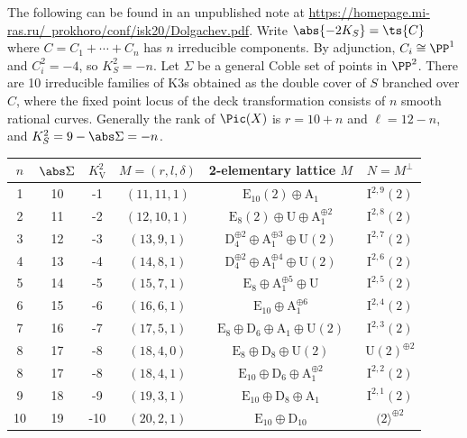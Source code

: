 \documentclass[../../main.tex]{subfiles}
\begin{document}
The following can be found in an unpublished note at \href{https://homepage.mi-ras.ru/~prokhoro/conf/isk20/Dolgachev.pdf}{https://homepage.mi-ras.ru/~prokhoro/conf/isk20/Dolgachev.pdf}.
Write $\abs{-2K_S} = \ts{C}$ where $C = C_1 + \cdots + C_n$ has $n$ irreducible components. By adjunction, $C_i\cong \PP^1$ and $C_i^2 = -4$, so $K_S^2 = -n$. Let $\Sigma$ be a general Coble set of points in $\PP^2$. There are 10 irreducible families of K3s obtained as the double cover of $S$ branched over $C$, where the fixed point locus of the deck transformation consists of $n$ smooth rational curves. Generally the rank of $\Pic(X)$ is $r=10+n$ and $\ell = 12-n$, and $K_S^2 = 9-\abs\Sigma = -n$.

\begin{tabular}{|c|c|c|c|c|c|}
\hline$n$ & $\abs\Sigma$ & $K_{\mathrm{V}}^{2}$ & $M = (r, l, \delta)$ & 2-elementary lattice $M$ & $N=M^{\perp}$ \\
\hline 1 & 10 & -1 & $(11,11,1)$ & $\mathrm{E}_{10}(2) \oplus \mathrm{A}_{1}$ & $\mathrm{I}^{2,9}(2)$ \\
2 & 11 & -2 & $(12,10,1)$ & $\mathrm{E}_{8}(2) \oplus \mathrm{U} \oplus \mathrm{A}_1^{\oplus 2}$ & $\mathrm{I}^{2,8}(2)$ \\
3 & 12 & -3 & $(13,9,1)$ & $\mathrm{D}_{4}^{\oplus 2} \oplus \mathrm{A}_{1}^{\oplus 3} \oplus \mathrm{U}(2)$ & $\mathrm{I}^{2,7}(2)$ \\
4 & 13 & -4 & $(14,8,1)$ & $\mathrm{D}_{4}^{\oplus 2} \oplus \mathrm{A}_{1}^{\oplus 4} \oplus \mathrm{U}(2)$ & $\mathrm{I}^{2,6}(2)$ \\
5 & 14 & -5 & $(15,7,1)$ & $\mathrm{E}_{8} \oplus \mathrm{A}_{1}^{\oplus 5} \oplus \mathrm{U}$ & $\mathrm{I}^{2,5}(2)$ \\
6 & 15 & -6 & $(16,6,1)$ & $\mathrm{E}_{10} \oplus \mathrm{A}_{1}^{\oplus 6}$ & $\mathrm{I}^{2,4}(2)$ \\
7 & 16 & -7 & $(17,5,1)$ & $\mathrm{E}_{8} \oplus \mathrm{D}_{6} \oplus \mathrm{A}_{1} \oplus \mathrm{U}(2)$ & $\mathrm{I}^{2,3}(2)$ \\
8 & 17 & -8 & $(18,4,0)$ & $\mathrm{E}_{8} \oplus \mathrm{D}_{8} \oplus \mathrm{U}(2)$ & $\mathrm{U}(2)^{\oplus 2}$ \\
8 & 17 & -8 & $(18,4,1)$ & $\mathrm{E}_{10} \oplus \mathrm{D}_{6} \oplus \mathrm{A}_{1}^{\oplus 2}$ & $\mathrm{I}^{2,2}(2)$ \\
9 & 18 & -9 & $(19,3,1)$ & $\mathrm{E}_{10} \oplus \mathrm{D}_{8} \oplus \mathrm{A}_{1}$ & $\mathrm{I}^{2,1}(2)$ \\
10 & 19 & -10 & $(20,2,1)$ & $\mathrm{E}_{10} \oplus \mathrm{D}_{10}$ & $(2\rangle^{\oplus 2}$ \\
\hline
\end{tabular}
\end{document}
